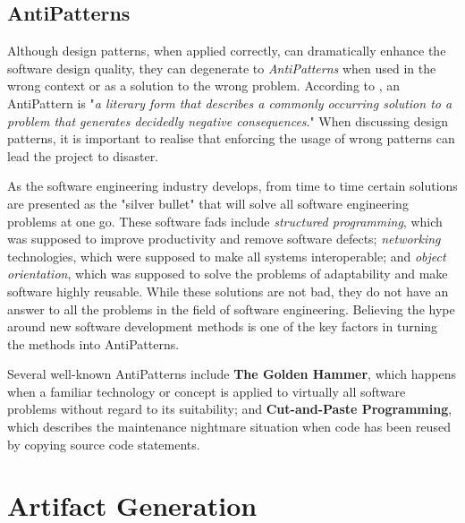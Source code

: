 \subsection{AntiPatterns}
\label{toc:webdevel:patterns:antipatterns}

Although design patterns, when applied correctly, can dramatically 
enhance the software design quality, they can degenerate to 
\textsl{AntiPatterns} when used in the wrong context or as a solution 
to the wrong problem. According to \cite{antipatterns}, an AntiPattern 
is "\textsl{a literary form that describes a commonly occurring 
solution to a problem that generates decidedly negative 
consequences}." When discussing design patterns, it is important to 
realise that enforcing the usage of wrong patterns can lead the 
project to disaster.

As the software engineering industry develops, from time to time 
certain solutions are presented as the "silver bullet" that will solve 
all software engineering problems at one go. These software fads 
include \textsl{structured programming}, which was supposed to improve 
productivity and remove software defects; \textsl{networking} 
technologies, which were supposed to make all systems interoperable; 
and \textsl{object orientation}, which was supposed to solve the 
problems of adaptability and make software highly reusable. While 
these solutions are not bad, they do not have an answer to all the 
problems in the field of software engineering. Believing the hype 
around new software development methods is one of the key factors in 
turning the methods into AntiPatterns. \citep{antipatterns}

Several well-known AntiPatterns include \textbf{The Golden Hammer}, 
which happens when a familiar technology or concept is applied to 
virtually all software problems without regard to its suitability; and 
\textbf{Cut-and-Paste Programming}, which describes the maintenance 
nightmare situation when code has been reused by copying source code 
statements. \citep{antipatterns}


\section{Artifact Generation}
\label{toc:webdevel:artifactgen}

